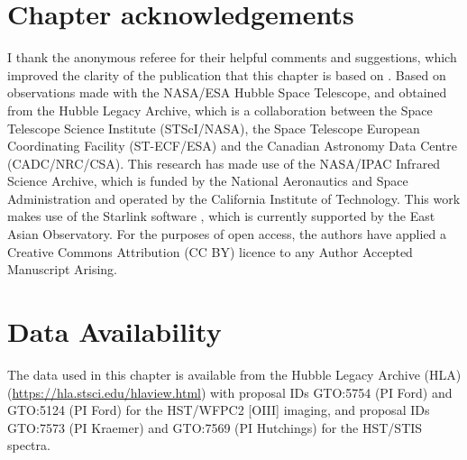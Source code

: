 \section*{Chapter acknowledgements}

I thank the anonymous referee for their helpful comments and suggestions, which improved the clarity of the publication that this chapter is based on \citep{HoldenTadhunter2023}. Based on observations made with the NASA/ESA Hubble Space Telescope, and obtained from the Hubble Legacy Archive, which is a collaboration between the Space Telescope Science Institute (STScI/NASA), the Space Telescope European Coordinating Facility (ST-ECF/ESA) and the Canadian Astronomy Data Centre (CADC/NRC/CSA). This research has made use of the NASA/IPAC Infrared Science Archive, which is funded by the National Aeronautics and Space Administration and operated by the California Institute of Technology. This work makes use of the Starlink software \citep{Currie2014}, which is currently supported by the East Asian Observatory. For the purposes of open access, the authors have applied a Creative Commons Attribution (CC BY) licence to any Author Accepted Manuscript Arising.


\section*{Data Availability}

The data used in this chapter is available from the Hubble Legacy Archive (HLA) (\url{https://hla.stsci.edu/hlaview.html}) with proposal IDs GTO:5754 (PI Ford) and GTO:5124 (PI Ford) for the HST/WFPC2 [OIII] imaging, and proposal IDs GTO:7573 (PI Kraemer) and GTO:7569 (PI Hutchings) for the HST/STIS spectra.